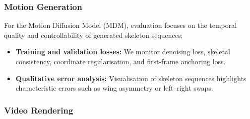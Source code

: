 \documentclass[final-report]{report-template}
\begin{document}
\subsubsection{Motion Generation}
For the Motion Diffusion Model (MDM), evaluation focuses on the temporal quality and controllability of generated skeleton sequences:
\begin{itemize}
    \item \textbf{Training and validation losses:} We monitor denoising loss, skeletal consistency, coordinate regularisation, and first-frame anchoring loss.
    \item \textbf{Qualitative error analysis:} Visualisation of skeleton sequences highlights characteristic errors such as wing asymmetry or left--right swaps.
\end{itemize}

\subsubsection{Video Rendering}


\end{document}
